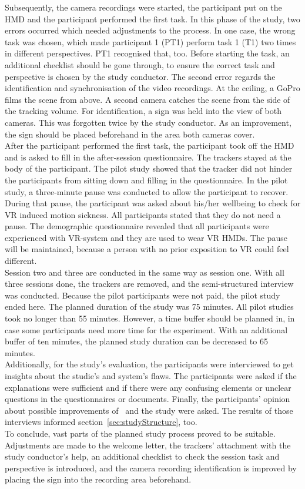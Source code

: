 Subsequently, the camera recordings were started, the participant put on the HMD and the participant performed the first task. In this phase of the study, two errors occurred which needed adjustments to the process. In one case, the wrong task was chosen, which made participant 1 (PT1) perform task 1 (T1) two times in different perspectives. PT1 recognised that, too. Before starting the task, an additional checklist should be gone through, to ensure the correct task and perspective is chosen by the study conductor. The second error regards the identification and synchronisation of the video recordings. At the ceiling, a GoPro films the scene from above. A second camera catches the scene from the side of the tracking volume. For identification, a sign was held into the view of both cameras. This was forgotten twice by the study conductor. As an improvement, the sign should be placed beforehand in the area both cameras cover.\\
After the participant performed the first task, the participant took off the HMD and is asked to fill in the after-session questionnaire. The trackers stayed at the body of the participant. The pilot study showed that the tracker did not hinder the participants from sitting down and filling in the questionnaire. In the pilot study, a three-minute pause was conducted to allow the participant to recover. During that pause, the participant was asked about his/her wellbeing to check for VR induced motion sickness. All participants stated that they do not need a pause. The demographic questionnaire revealed that all participants were experienced with VR-system and they are used to wear VR HMDs. The pause will be maintained, because a person with no prior exposition to VR could feel different.\\
Session two and three are conducted in the same way as session one. With all three sessions done, the trackers are removed, and the semi-structured interview was conducted. Because the pilot participants were not paid, the pilot study ended here. The planned duration of the study was 75 minutes. All pilot studies took no longer than 55 minutes. However, a time buffer should be planned in, in case some participants need more time for the experiment. With an additional buffer of ten minutes, the planned study duration can be decreased to 65 minutes.\\
Additionally, for the study's evaluation, the participants were interviewed to get insights about the studie's and system's flaws. The participants were asked if the explanations were sufficient and if there were any confusing elements or unclear questions in the questionnaires or documents. Finally, the participants' opinion about possible improvements of \exgo\ and the study were asked. The results of those interviews informed section~\ref{sec:studyStructure}, too.\\
To conclude, vast parts of the planned study process proved to be suitable. Adjustments are made to the welcome letter, the trackers' attachment with the study conductor's help, an additional checklist to check the session task and perspective is introduced, and the camera recording identification is improved by placing the sign into the recording area beforehand.

